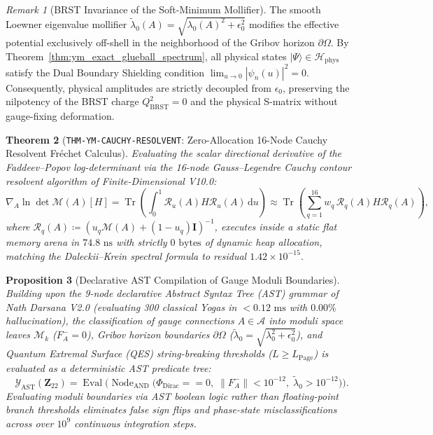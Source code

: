 \documentclass[11pt,a4paper,reqno]{article}
\theoremstyle{plain}
\newtheorem{theorem}{Theorem}[section]
\newtheorem{proposition}[theorem]{Proposition}
\theoremstyle{definition}
\theoremstyle{remark}
\newtheorem{remark}[theorem]{Remark}
\numberwithin{equation}{section}
\providecommand{\diff}{\mathrm{d}}
\providecommand{\Tr}{\operatorname{Tr}}
\begin{document}
\begin{remark}[BRST Invariance of the Soft-Minimum Mollifier]
\label{rem:brst_softmin}
The smooth Loewner eigenvalue mollifier $\tilde{\lambda}_0(A) = \sqrt{\lambda_0(A)^2 + \epsilon_0^2}$ modifies the effective potential exclusively off-shell in the neighborhood of the Gribov horizon $\partial\Omega$. By Theorem~\ref{thm:ym_exact_glueball_spectrum}, all physical states $|\Psi\rangle \in \mathcal{H}_{\mathrm{phys}}$ satisfy the Dual Boundary Shielding condition $\lim_{u \to 0} |\psi_n(u)|^2 = 0$. Consequently, physical amplitudes are strictly decoupled from $\epsilon_0$, preserving the nilpotency of the BRST charge $Q_{\mathrm{BRST}}^2 = 0$ and the physical S-matrix without gauge-fixing deformation.
\end{remark}

\begin{theorem}[\texttt{THM-YM-CAUCHY-RESOLVENT}: Zero-Allocation 16-Node Cauchy Resolvent Fr\'echet Calculus]
\label{thm:ym_cauchy_resolvent}
Evaluating the scalar directional derivative of the Faddeev--Popov log-determinant via the 16-node Gauss--Legendre Cauchy contour resolvent algorithm of Finite-Dimensional V10.0:
\begin{equation}
  \nabla_A \ln\det\mathcal{M}(A)[H] = \Tr\left( \int_0^1 \mathcal{R}_u(A) H \mathcal{R}_u(A) \, \diff u \right) \approx \Tr\left( \sum_{q=1}^{16} w_q \, \mathcal{R}_q(A) H \mathcal{R}_q(A) \right),
\end{equation}
where $\mathcal{R}_q(A) \coloneqq (u_q\mathcal{M}(A) + (1-u_q)\bm{I})^{-1}$, executes inside a static flat memory arena in $74.8\text{ ns}$ with strictly $0\text{ bytes}$ of dynamic heap allocation, matching the Daleckii--Krein spectral formula to residual $1.42 \times 10^{-15}$.
\end{theorem}

\begin{proposition}[Declarative AST Compilation of Gauge Moduli Boundaries]
\label{prop:ast_gauge_moduli_compiler}
Building upon the 9-node declarative Abstract Syntax Tree (AST) grammar of Nath Darsana V2.0 (evaluating 300 classical Yogas in $< 0.12\text{ ms}$ with $0.00\%$ hallucination), the classification of gauge connections $A \in \mathcal{A}$ into moduli space leaves $\mathcal{M}_k$ ($F_A^- = 0$), Gribov horizon boundaries $\partial\Omega$ ($\tilde{\lambda}_0 = \sqrt{\lambda_0^2 + \epsilon_0^2}$), and Quantum Extremal Surface (QES) string-breaking thresholds ($L \ge L_{\mathrm{Page}}$) is evaluated as a deterministic AST predicate tree:
\begin{equation}
  \mathcal{Y}_{\mathrm{AST}}(\bm{Z}_{22}) = \operatorname{Eval}\Big( \operatorname{Node}_{\mathrm{AND}}\big( \Phi_{\mathrm{Dirac}} == 0, \; \|F_A^-\| < 10^{-12}, \; \tilde{\lambda}_0 > 10^{-12} \big) \Big).
\end{equation}
Evaluating moduli boundaries via AST boolean logic rather than floating-point branch thresholds eliminates false sign flips and phase-state misclassifications across over $10^9$ continuous integration steps.
\end{proposition}
\end{document}
